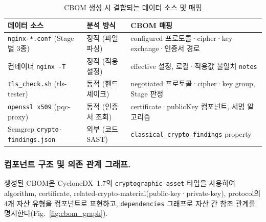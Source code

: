\begin{table}[htbp]
\centering
\renewcommand{\arraystretch}{1.3}
\caption{CBOM 생성 시 결합되는 데이터 소스 및 매핑}
\label{tab:cbom_sources}
\begin{tabular}{p{3.4cm}p{2.6cm}p{5.4cm}}
\toprule
데이터 소스 & 분석 방식 & CBOM 매핑 \\
\midrule
\texttt{nginx-*.conf} \newline (Stage별 3종)
  & 정적 (파일 파싱)
  & configured 프로토콜·cipher·key exchange·인증서 경로 \\
컨테이너 \texttt{nginx -T}
  & 정적 (적용 설정)
  & effective 설정, 로컬·적용값 불일치 \texttt{notes} \\
\texttt{tls\_check.sh} \newline (tls-tester)
  & 동적 (핸드셰이크)
  & negotiated 프로토콜·cipher·key group, Stage 판정 \\
\texttt{openssl x509} \newline (pqc-proxy)
  & 동적 (인증서 조회)
  & certificate·publicKey 컴포넌트, 서명 알고리즘 \\
Semgrep \newline \texttt{crypto-findings.json}
  & 외부 (코드 SAST)
  & \texttt{classical\_crypto\_findings} property \\
\bottomrule
\end{tabular}
\end{table}

\subsubsection{컴포넌트 구조 및 의존 관계 그래프.}

생성된 CBOM은 CycloneDX~1.7의 \texttt{cryptographic-asset} 타입을 사용하여 algorithm, certificate, related-crypto-material(public-key·private-key), protocol의 4개 자산 유형을 컴포넌트로 표현하고, \texttt{dependencies} 그래프로 자산 간 참조 관계를 명시한다(Fig.~\ref{fig:cbom_graph}).

